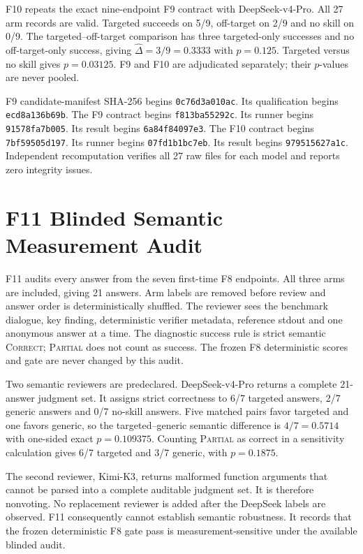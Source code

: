 F10 repeats the exact nine-endpoint F9 contract with DeepSeek-v4-Pro. All 27 arm records are valid. Targeted succeeds on 5/9, off-target on 2/9 and no skill on 0/9. The targeted--off-target comparison has three targeted-only successes and no off-target-only success, giving $\widehat{\Delta}=3/9=0.3333$ with $p=0.125$. Targeted versus no skill gives $p=0.03125$. F9 and F10 are adjudicated separately; their $p$-values are never pooled.

F9 candidate-manifest SHA-256 begins \texttt{0c76d3a010ac}. Its qualification begins \texttt{ecd8a136b69b}. The F9 contract begins \texttt{f813ba55292c}. Its runner begins \texttt{91578fa7b005}. Its result begins \texttt{6a84f84097e3}. The F10 contract begins \texttt{7bf59505d197}. Its runner begins \texttt{07fd1b1bc7eb}. Its result begins \texttt{979515627a1c}. Independent recomputation verifies all 27 raw files for each model and reports zero integrity issues.

\section{F11 Blinded Semantic Measurement Audit}
\label{app:f11}
F11 audits every answer from the seven first-time F8 endpoints. All three arms are included, giving 21 answers. Arm labels are removed before review and answer order is deterministically shuffled. The reviewer sees the benchmark dialogue, key finding, deterministic verifier metadata, reference stdout and one anonymous answer at a time. The diagnostic success rule is strict semantic \textsc{Correct}; \textsc{Partial} does not count as success. The frozen F8 deterministic scores and gate are never changed by this audit.

Two semantic reviewers are predeclared. DeepSeek-v4-Pro returns a complete 21-answer judgment set. It assigns strict correctness to 6/7 targeted answers, 2/7 generic answers and 0/7 no-skill answers. Five matched pairs favor targeted and one favors generic, so the targeted--generic semantic difference is $4/7=0.5714$ with one-sided exact $p=0.109375$. Counting \textsc{Partial} as correct in a sensitivity calculation gives 6/7 targeted and 3/7 generic, with $p=0.1875$.

The second reviewer, Kimi-K3, returns malformed function arguments that cannot be parsed into a complete auditable judgment set. It is therefore nonvoting. No replacement reviewer is added after the DeepSeek labels are observed. F11 consequently cannot establish semantic robustness. It records that the frozen deterministic F8 gate pass is measurement-sensitive under the available blinded audit.

